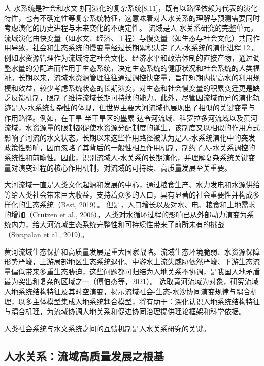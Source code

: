 人-水系统是社会和水文协同演化的复杂系统[8,11]，既有以路径依赖为代表的演化特性，也有不确定性等复杂系统特征，这意味着对人水关系的理解与预测需要同时考虑演化的历史进程与未来变化的不确定性。
流域是人-水关系研究的完整单元，流域演化由快变量（如水文、经济、工程）与慢变量（如生态与社会文化）共同作用导致，社会和生态系统的慢变量经过长期累积决定了人-水系统的演化进程[12]。
例如水资源管理作为流域特定社会文化、经济水平和政治体制的直接产物，通过调整水量的分配进而作用于生态系统，决定生态系统的健康状况和社会系统的人类福祉。长期以来，流域水资源管理往往通过调控快变量，旨在短期内提高水的利用规模和效益，较少考虑系统状态的长期演变，对生态和社会慢变量的积累变迁更是缺乏反馈机制，限制了维持流域长期可持续的能力。此外，尽管因流域而异的演化轨迹是人-水系统复杂性的体现，但世界主要大河流域也展现出了相似的关键变量与作用路径。例如，在干旱-半干旱区的墨累-达令河流域、科罗拉多河流域以及黄河流域，水资源量的限制都促使水资源分配制度的诞生，该制度又以相似的作用方式影响了河流的水文状态。长期以来这些作用路径被认为是人-水系统演化中的突发政策性影响，因而忽略了其背后的一般性相互作用机制，制约了人-水关系调控的系统性和前瞻性。因此，识别流域人-水关系的长期演化，并理解复杂系统关键变量对演变过程的核心作用机制，对流域的可持续、高质量发展至关重要。


大河流域一直是人类文化起源和发展的中心，通过粮食生产、水力发电和水源供给等给人类社会带来巨大收益，支持着众多的人口，具有显著的社会重要性并构成多样化的生态系统（Best, 2019）。
但是，人口增长以及对水、电、粮食和土地需求的增加（Crutzen et al., 2006），人类对水循环过程的影响已从外部动力演变为系统内力，给大河流域生态系统完整性和可持续性带来了前所未有的挑战（Sivapalan et al., 2019）。

黄河流域生态保护和高质量发展是重大国家战略。流域生态环境脆弱、水资源保障形势严峻，上游局部地区生态系统退化、中游水土流失威胁依然严峻、下游生态流量偏低带来多重生态胁迫，这些问题都可归结为人地关系不协调，是我国人地矛盾最为突出和复杂的区域之一（傅伯杰等，2021）。
选取黄河流域为对象，研究流域人地系统结构特征及其时空演变，揭示流域社会-生态-水沙协同演变规律与耦合机理，以多主体模型集成人地系统耦合模型，将有助于：深化认识人地系统结构特征与耦合机理，为流域协调人地关系和促进协同治理提供理论框架和科学依据。

人类社会系统与水文系统之间的互馈机制是人水关系研究的关键。

\subsection{人水关系：流域高质量发展之根基}


